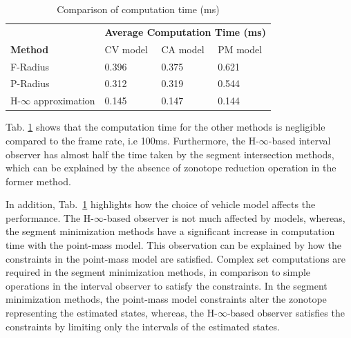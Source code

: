 \begin{table}[!h]
\caption{Comparison of computation time (ms)\\}
	\centering
	\renewcommand{\arraystretch}{1.1}
	\small	
	\begin{tabular}{l l l l}
		\toprule
		& \multicolumn{3}{c}{\textbf{Average Computation Time (ms)}}\\
		\textbf{Method} & CV model & CA model & PM model\\ \midrule
		F-Radius & 0.396 & 0.375 & 0.621 \\
		P-Radius & 0.312 & 0.319 & 0.544\\
		H-$\infty$ approximation & 0.145 & 0.147 & 0.144\\
		\bottomrule
	\end{tabular}
	\label{tab:comptime}
\end{table}
Tab. \ref{tab:comptime} shows that the computation time for the other methods is negligible compared to the frame rate, i.e 100ms. Furthermore, the H-$\infty$-based interval observer has almost half the time taken by the segment intersection methods, which can be explained by the absence of zonotope reduction operation in the former method. 

In addition, Tab.~\ref{tab:comptime} highlights how the choice of vehicle model affects the performance. The H-$\infty$-based observer is not much affected by models, whereas, the segment minimization methods have a significant increase in computation time with the point-mass model. This observation can be explained by how the constraints in the point-mass model are satisfied. Complex set computations are required in the segment minimization methods, in comparison to simple operations in the interval observer to satisfy the constraints. In the segment minimization methods, the point-mass model constraints alter the zonotope representing the estimated states, whereas, the H-$\infty$-based observer satisfies the constraints by limiting only the intervals of the estimated states.  

